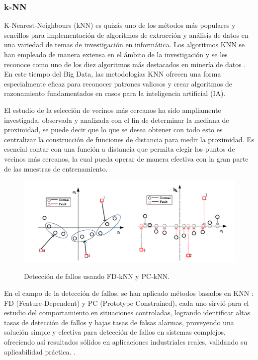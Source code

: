 \documentclass[11pt,a4paper,spanish]{book}
\numberwithin{equation}{chapter}
\numberwithin{figure}{chapter}
\begin{document}
\subsubsection{k-NN}


K-Nearest-Neighbours (kNN) es quizás uno de los métodos más populares y sencillos para 
implementación de algoritmos de extracción y análisis de datos en una variedad de temas 
de investigación en informática. Los algoritmos KNN se han empleado de manera extensa 
en el ámbito de la investigación y se les reconoce como uno de los diez algoritmos más 
destacados en minería de datos \cite{witten2005data}. En este tiempo del Big Data, 
las metodologías KNN ofrecen una forma especialmente eficaz para reconocer patrones 
valiosos y crear algoritmos de razonamiento fundamentados en casos para la inteligencia 
artificial (IA). \cite{wu2008top}


El estudio de la selección de vecinos más cercanos ha sido ampliamente investigada, 
observada y analizada con el fin de determinar la mediana de proximidad, se puede decir 
que lo que se desea obtener con todo esto es centralizar la construcción de funciones de 
distancia para medir la proximidad. Es esencial contar con una función a distancia que 
permita elegir los puntos de vecinos más cercanos, la cual pueda operar de manera 
efectiva con la gran parte de las muestras de entrenamiento. \cite{zhang2022influence}

\begin{figure}[h]
    \caption{Detección de fallos usando FD‑kNN y PC‑kNN. \protect\cite{zhou2015faultdetection}}
    \centering
    \includegraphics[width=1.0\textwidth]{media/knn-zhou.png}
    \label{fig:figKnnZhou}
\end{figure}


En el campo de la detección de fallos, se han aplicado métodos basados en KNN : FD 
(Feature-Dependent) y PC (Prototype Constrained), cada uno sirvió para el estudio del 
comportamiento en situaciones controladas, logrando identificar altas tasas de detección 
de fallos y bajas tasas de falsas alarmas, proveyendo una solución simple y efectiva 
para detección de fallos en sistemas complejos, ofreciendo así resultados sólidos en 
aplicaciones industriales reales, validando su aplicabilidad práctica.
\cite{zhou2015faultdetection}.
\end{document}
